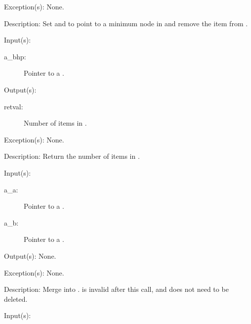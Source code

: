 \begin{capi}
\begin{capilist}
	\item[Exception(s): ] None.
	\item[Description: ]
		Set  and  to point to a
		minimum node in  and remove the item from
		.
	\end{capilist}
\label{bhp_size_get}
	\begin{capilist}
	\item[Input(s): ]
		\begin{description}\item[]
		\item[a\_bhp: ]
			Pointer to a .
		\end{description}
	\item[Output(s): ]
		\begin{description}\item[]
		\item[retval: ]
			Number of items in .
		\end{description}
	\item[Exception(s): ] None.
	\item[Description: ]
		Return the number of items in .
	\end{capilist}
\label{bhp_union}
	\begin{capilist}
	\item[Input(s): ]
		\begin{description}\item[]
		\item[a\_a: ]
			Pointer to a \classname{bhp}.
		\item[a\_b: ]
			Pointer to a \classname{bhp}.
		\end{description}
	\item[Output(s): ] None.
	\item[Exception(s): ] None.
	\item[Description: ]
		Merge  into .   is invalid
		after this call, and does not need to be deleted.
	\end{capilist}
\label{bhp_priority_compare_uint32}
	\begin{capilist}
	\item[Input(s): ]

\end{capilist}
\end{capi}
